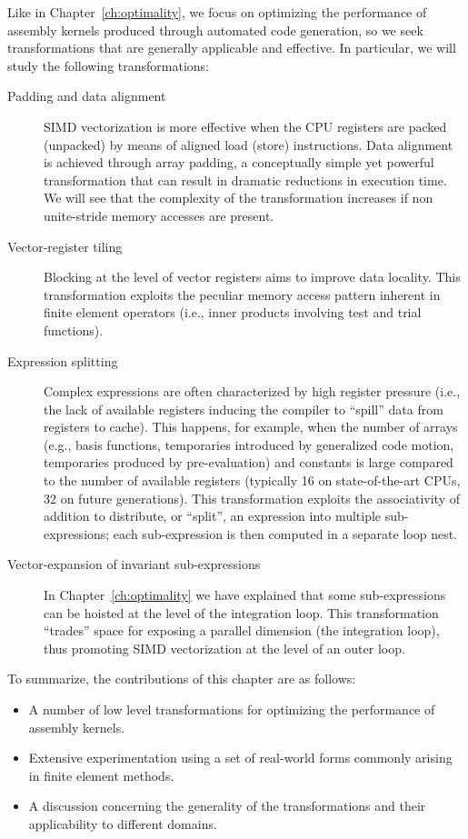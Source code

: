 Like in Chapter~\ref{ch:optimality}, we focus on optimizing the performance of assembly kernels produced through automated code generation, so we seek transformations that are generally applicable and effective. In particular, we will study the following transformations:
\begin{description}
\item[Padding and data alignment] SIMD vectorization is more effective when the CPU registers are packed (unpacked) by means of aligned load (store) instructions. Data alignment is achieved through array padding, a conceptually simple yet powerful transformation that can result in dramatic reductions in execution time. We will see that the complexity of the transformation increases if non unite-stride memory accesses are present.
\item[Vector-register tiling] Blocking at the level of vector registers aims to improve data locality. This transformation exploits the peculiar memory access pattern inherent in finite element operators (i.e., inner products involving test and trial functions).  
\item[Expression splitting] Complex expressions are often characterized by high register pressure (i.e., the lack of available registers inducing the compiler to ``spill'' data from registers to cache). This happens, for example, when the number of arrays (e.g., basis functions, temporaries introduced by generalized code motion, temporaries produced by pre-evaluation) and constants is large compared to the number of available registers (typically 16 on state-of-the-art CPUs, 32 on future generations). This transformation exploits the associativity of addition to distribute, or ``split'', an expression into multiple sub-expressions; each sub-expression is then computed in a separate loop nest.
\item[Vector-expansion of invariant sub-expressions] In Chapter~\ref{ch:optimality} we have explained that some sub-expressions can be hoisted at the level of the integration loop. This transformation ``trades'' space for exposing a parallel dimension (the integration loop), thus promoting SIMD vectorization at the level of an outer loop.
\end{description}

To summarize, the contributions of this chapter are as follows:
\begin{itemize}
\item A number of low level transformations for optimizing the performance of assembly kernels.
\item Extensive experimentation using a set of real-world forms commonly arising in finite element methods.
\item A discussion concerning the generality of the transformations and their applicability to different domains.
\end{itemize}

